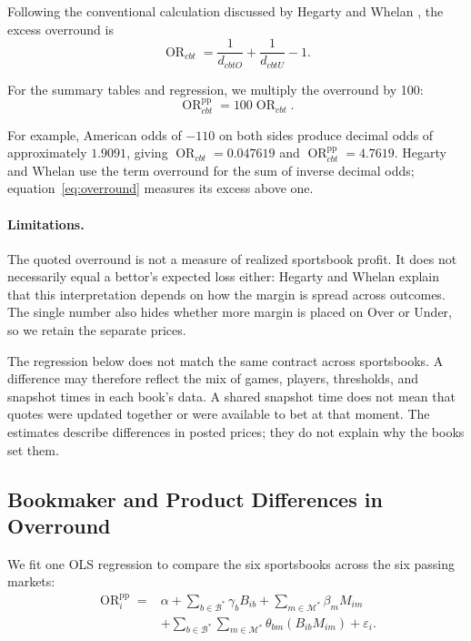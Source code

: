 \documentclass[11pt]{article}
\begin{document}
Following the conventional calculation discussed by Hegarty and Whelan
\cite[p.~4, equation~(1)]{hegartywhelan2025}, the excess overround is
\begin{equation}
\label{eq:overround}
\operatorname{OR}_{cbt}
=
\frac{1}{d_{cbtO}}
+
\frac{1}{d_{cbtU}}
-1.
\end{equation}

For the summary tables and regression, we multiply the overround by 100:
\begin{equation}
\operatorname{OR}^{\mathrm{pp}}_{cbt}
=
100 \operatorname{OR}_{cbt}.
\end{equation}


For example, American odds of $-110$ on both sides produce decimal odds
of approximately $1.9091$, giving
$\operatorname{OR}_{cbt}=0.047619$ and
$\operatorname{OR}^{\mathrm{pp}}_{cbt}=4.7619$.
Hegarty and Whelan use the term overround for the sum of inverse decimal
odds; equation~\eqref{eq:overround} measures its excess above one.

\paragraph{Limitations.}
The quoted overround is not a measure of realized sportsbook profit.
It does not necessarily equal a bettor's expected loss either: Hegarty
and Whelan \cite[pp.~5--7]{hegartywhelan2025} explain that this
interpretation depends on how the margin is spread across outcomes.
The single number also hides whether more margin is placed on Over or
Under, so we retain the separate prices.

The regression below does not match the same contract across
sportsbooks. A difference may therefore reflect the mix of games,
players, thresholds, and snapshot times in each book's data. A shared
snapshot time does not mean that quotes were updated together or were
available to bet at that moment. The estimates describe differences
in posted prices; they do not explain why the books set them.

\clearpage
\subsection{Bookmaker and Product Differences in Overround}

We fit one OLS regression to compare the six sportsbooks across the
six passing markets:
\begin{equation}
\label{eq:bookmaker_market}
\begin{aligned}
\operatorname{OR}^{\mathrm{pp}}_{i}
={}&\alpha
+\sum_{b\in\mathcal{B}^{*}}\gamma_b B_{ib}
+\sum_{m\in\mathcal{M}^{*}}\beta_m M_{im} \\
&+\sum_{b\in\mathcal{B}^{*}}\sum_{m\in\mathcal{M}^{*}}
\theta_{bm}(B_{ib}M_{im})+\varepsilon_i.
\end{aligned}
\end{equation}
\end{document}
